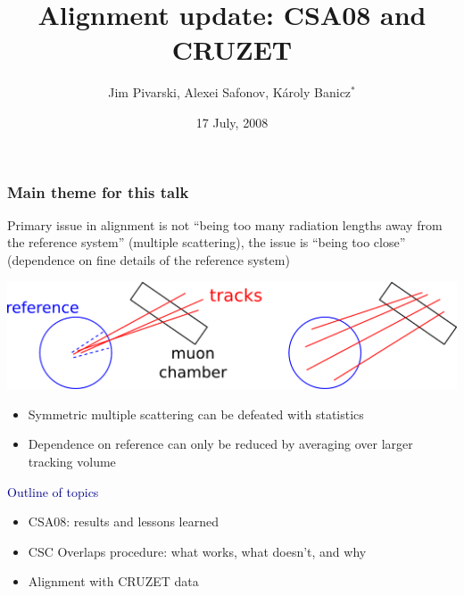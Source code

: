 \documentclass[compress]{beamer}
\title{Alignment update: CSA08 and CRUZET}
\author{Jim Pivarski, Alexei Safonov, K\'aroly Banicz$^*$}
\institute{Texas A\&M University, $^*$US-CMS}
\date{17 July, 2008}
\begin{document}
\frame{\titlepage}


\begin{frame}
\frametitle{Main theme for this talk}
\small

Primary issue in alignment is not ``being too many radiation lengths
away from the reference system'' (multiple scattering), the issue is ``being
too close'' (dependence on fine details of the reference system)

\vspace{-0.15 cm}
\begin{center}
\includegraphics[width=0.7\linewidth]{limited_reference.png}
\end{center}

\vspace{-0.3 cm}
\begin{itemize}\setlength{\itemsep}{-0.075 cm}
\item Symmetric multiple scattering can be defeated with statistics
\item Dependence on reference can only be reduced by averaging over larger tracking volume
\end{itemize}

\vspace{0.1 cm}
\hspace{-0.83 cm} \textcolor{darkblue}{\Large Outline of topics}

\begin{itemize}\setlength{\itemsep}{-0.075 cm}
\item CSA08: results and lessons learned
\item CSC Overlaps procedure: what works, what doesn't, and why
\item Alignment with CRUZET data
\end{itemize}

\vspace{-1 cm}
\mbox{ }
\end{frame}
\end{document}
